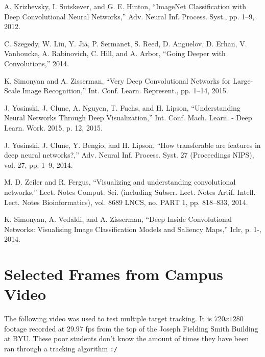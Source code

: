 \documentclass[hidelinks]{article}
\begin{document}
\begin{thebibliography}{99}
 A. Krizhevsky, I. Sutskever, and G. E. Hinton, “ImageNet Classification with Deep Convolutional Neural Networks,” Adv. Neural Inf. Process. Syst., pp. 1–9, 2012.

 C. Szegedy, W. Liu, Y. Jia, P. Sermanet, S. Reed, D. Anguelov, D. Erhan, V. Vanhoucke, A. Rabinovich, C. Hill, and A. Arbor, “Going Deeper with Convolutions,” 2014.

 K. Simonyan and A. Zisserman, “Very Deep Convolutional Networks for Large-Scale Image Recognition,” Int. Conf. Learn. Represent., pp. 1–14, 2015.

 J. Yosinski, J. Clune, A. Nguyen, T. Fuchs, and H. Lipson, “Understanding Neural Networks Through Deep Visualization,” Int. Conf. Mach. Learn. - Deep Learn. Work. 2015, p. 12, 2015.

 J. Yosinski, J. Clune, Y. Bengio, and H. Lipson, “How transferable are features in deep neural networks?,” Adv. Neural Inf. Process. Syst. 27 (Proceedings NIPS), vol. 27, pp. 1–9, 2014.

 M. D. Zeiler and R. Fergus, “Visualizing and understanding convolutional networks,” Lect. Notes Comput. Sci. (including Subser. Lect. Notes Artif. Intell. Lect. Notes Bioinformatics), vol. 8689 LNCS, no. PART 1, pp. 818–833, 2014.

 K. Simonyan, A. Vedaldi, and A. Zisserman, “Deep Inside Convolutional Networks: Visualising Image Classification Models and Saliency Maps,” Iclr, p. 1-, 2014.


\end{thebibliography}

\newpage
\appendix
\section{Selected Frames from Campus Video} \label{app:campus}
The following video was used to test multiple target tracking. It is $720x1280$ footage recorded at $29.97$ fps from the top of the Joseph Fielding Smith Building at BYU. These poor students don't know the amount of times they have been ran through a tracking algorithm \texttt{:/}
\end{document}
